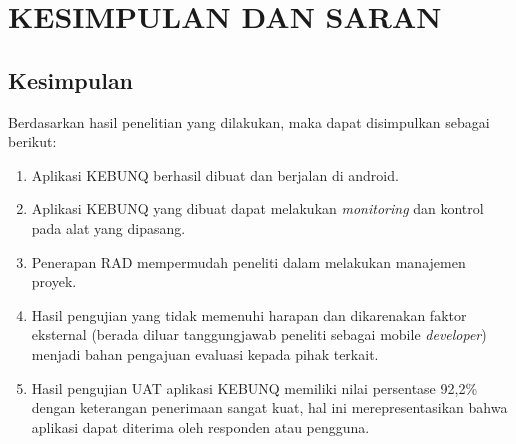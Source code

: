 \chapter{KESIMPULAN DAN SARAN}

%
\vspace{4.5pt}

\begin{flushleft}
    \begin{justify}
        \section{Kesimpulan}
        Berdasarkan hasil penelitian yang dilakukan, maka dapat disimpulkan sebagai berikut:
        \begin{enumerate}
            \item Aplikasi KEBUNQ berhasil dibuat dan berjalan di android.
            \item Aplikasi KEBUNQ yang dibuat dapat melakukan \emph{monitoring} dan kontrol pada alat yang dipasang.
            \item Penerapan RAD mempermudah peneliti dalam melakukan manajemen proyek.
            \item Hasil pengujian yang tidak memenuhi harapan dan dikarenakan faktor eksternal (berada diluar tanggungjawab peneliti sebagai mobile \emph{developer}) 
            menjadi bahan pengajuan evaluasi kepada pihak terkait. 
            \item Hasil pengujian UAT aplikasi KEBUNQ memiliki nilai persentase 92,2\% dengan keterangan penerimaan sangat kuat, hal ini merepresentasikan bahwa aplikasi dapat diterima oleh responden atau pengguna.\\
        \end{enumerate}


\end{justify}
\end{flushleft}
